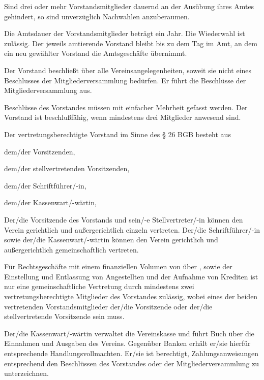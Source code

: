 \documentclass[draft]{scrartcl}
\begin{document}
\begin{contract}
Sind drei oder mehr Vorstandsmitglieder dauernd an der Ausübung ihres Amtes
gehindert, so sind unverzüglich Nachwahlen anzuberaumen.

Die Amtsdauer der Vorstandsmitglieder beträgt ein Jahr. Die Wiederwahl ist
zulässig. Der jeweils amtierende Vorstand bleibt bis zu dem Tag im Amt, an dem
ein neu gewählter Vorstand die Amtsgeschäfte übernimmt.

Der Vorstand beschließt über alle Vereinsangelegenheiten, soweit sie nicht
eines Beschlusses der Mitgliederversammlung bedürfen. Er führt die Beschlüsse
der Mitgliederversammlung aus.

Beschlüsse des Vorstandes müssen mit einfacher Mehrheit gefasst werden. Der
Vorstand ist beschlußfähig, wenn mindestens drei Mitglieder anwesend sind.


Der vertretungsberechtigte Vorstand im Sinne des § 26 BGB besteht aus 
\begin{compactenum}[\hspace{2em}1.]
  \item dem/der Vorsitzenden,
  \item dem/der stellvertretenden Vorsitzenden,
  \item dem/der Schriftführer/-in,
  \item dem/der Kassenwart/-wärtin,
\end{compactenum}

Der/die Vorsitzende des Vorstands und sein/-e Stellvertreter/-in können den
Verein gerichtlich und außergerichtlich einzeln vertreten. Der/die Schriftführer/-in
sowie der/die Kassenwart/-wärtin können den Verein gerichtlich und
außergerichtlich gemeinschaftlich vertreten. 

Für Rechtsgeschäfte mit einem 
finanziellen Volumen von über , sowie der Einstellung und Entlassung von 
Angestellten und der Aufnahme von Krediten ist nur eine gemeinschaftliche Vertretung 
durch mindestens zwei vertretungsberechtigte Mitglieder des Vorstandes zulässig, wobei 
eines der beiden vertretenden Vorstandsmitglieder der/die Vorsitzende oder der/die 
stellvertretende Vorsitzende sein muss.

Der/die Kassenwart/-wärtin verwaltet die Vereinskasse und führt Buch über die
Einnahmen und Ausgaben des Vereins. Gegenüber Banken erhält er/sie hierfür
entsprechende Handlungsvollmachten. Er/sie ist berechtigt, Zahlungsanweisungen
entsprechend den Beschlüssen des Vorstandes oder der Mitgliederversammlung zu
unterzeichnen.


\end{contract}
\end{document}
